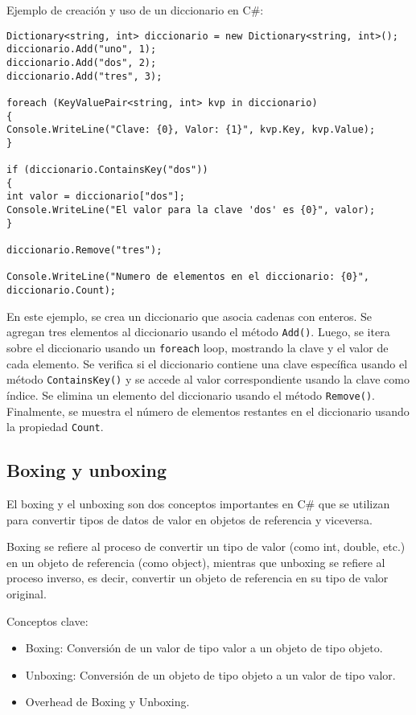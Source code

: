 \documentclass[executivepaper]{article}
\begin{document}
Ejemplo de creación y uso de un diccionario en C\#:
\begin{lstlisting}
Dictionary<string, int> diccionario = new Dictionary<string, int>();
diccionario.Add("uno", 1);
diccionario.Add("dos", 2);
diccionario.Add("tres", 3);

foreach (KeyValuePair<string, int> kvp in diccionario)
{
Console.WriteLine("Clave: {0}, Valor: {1}", kvp.Key, kvp.Value);
}

if (diccionario.ContainsKey("dos"))
{
int valor = diccionario["dos"];
Console.WriteLine("El valor para la clave 'dos' es {0}", valor);
}

diccionario.Remove("tres");

Console.WriteLine("Numero de elementos en el diccionario: {0}", diccionario.Count);
\end{lstlisting}

En este ejemplo, se crea un diccionario que asocia cadenas con enteros. Se agregan tres elementos al diccionario usando el método \texttt{Add()}. Luego, se itera sobre el diccionario usando un \texttt{foreach} loop, mostrando la clave y el valor de cada elemento. Se verifica si el diccionario contiene una clave específica usando el método \texttt{ContainsKey()} y se accede al valor correspondiente usando la clave como índice. Se elimina un elemento del diccionario usando el método \texttt{Remove()}. Finalmente, se muestra el número de elementos restantes en el diccionario usando la propiedad \texttt{Count}.

\subsection*{Boxing y unboxing}

El boxing y el unboxing son dos conceptos importantes en C\# que se utilizan para convertir tipos de datos de valor en objetos de referencia y viceversa.

Boxing se refiere al proceso de convertir un tipo de valor (como int, double, etc.) en un objeto de referencia (como object), mientras que unboxing se refiere al proceso inverso, es decir, convertir un objeto de referencia en su tipo de valor original.

Conceptos clave:
\begin{itemize}
\item Boxing: Conversión de un valor de tipo valor a un objeto de tipo objeto.
\item Unboxing: Conversión de un objeto de tipo objeto a un valor de tipo valor.
\item Overhead de Boxing y Unboxing.
\end{itemize}
\end{document}
